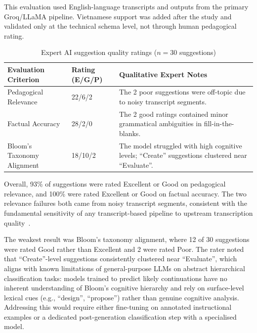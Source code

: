 This evaluation used English-language transcripts and outputs from the primary Groq/LLaMA pipeline. Vietnamese support was added after the study and validated only at the technical schema level, not through human pedagogical rating.

\begin{table}[H]
  \centering
  \begin{tabularx}{\linewidth}{>{\raggedright\arraybackslash}p{3.2cm} l >{\raggedright\arraybackslash}X}
    \toprule
    \textbf{Evaluation Criterion} & \textbf{Rating (E/G/P)} & \textbf{Qualitative Expert Notes} \\
    \midrule
    Pedagogical Relevance & 22/6/2 & The 2 poor suggestions were off-topic due to noisy transcript segments. \\
    \addlinespace
    Factual Accuracy & 28/2/0 & The 2 good ratings contained minor grammatical ambiguities in fill-in-the-blanks. \\
    \addlinespace
    Bloom's Taxonomy Alignment & 18/10/2 & The model struggled with high cognitive levels; ``Create'' suggestions clustered near ``Evaluate''. \\
    \bottomrule
  \end{tabularx}
  \small
  \caption{Expert AI suggestion quality ratings ($n=30$ suggestions)}
  \label{tab:ai_quality}
\end{table}

Overall, 93\% of suggestions were rated Excellent or Good on pedagogical relevance, and 100\% were rated Excellent or Good on factual accuracy. The two relevance failures both came from noisy transcript segments, consistent with the fundamental sensitivity of any transcript-based pipeline to upstream transcription quality~\cite{radford2023}.

The weakest result was Bloom's taxonomy alignment, where 12 of 30 suggestions were rated Good rather than Excellent and 2 were rated Poor. The rater noted that ``Create''-level suggestions consistently clustered near ``Evaluate'', which aligns with known limitations of general-purpose LLMs on abstract hierarchical classification tasks: models trained to predict likely continuations have no inherent understanding of Bloom's cognitive hierarchy and rely on surface-level lexical cues (e.g., ``design'', ``propose'') rather than genuine cognitive analysis. Addressing this would require either fine-tuning on annotated instructional examples or a dedicated post-generation classification step with a specialised model.

